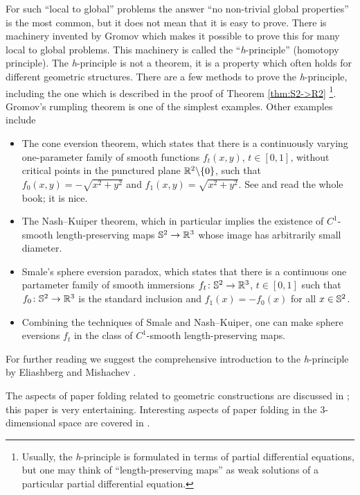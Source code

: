 For such ``local to global'' problems the answer
``no non-trivial global properties''
 is the most common, 
but
it does not mean that it is easy to prove.
There is machinery invented by Gromov
which makes it possible to prove this for many local to global problems.
This machinery is called the ``\textit{h}-principle'' (homotopy principle).
The \textit{h}-principle is not a theorem, it is a property which often holds for different geometric structures.
There are a few methods to prove the
\textit{h}-principle, including the one which is described in the proof of Theorem \ref{thm:S2->R2}%
\footnote{Usually, the \textit{h}-principle is formulated in terms of partial differential equations, 
but one may think of ``length-preserving maps'' as weak solutions of a particular partial differential equation.}.
Gromov's rumpling theorem is one of the simplest examples.
Other examples include 
\begin{itemize}
\item The cone eversion theorem, which states that there is a continuously varying one-parameter family of smooth functions $f_t(x,y)$, $t\in[0,1]$, without critical points in
the punctured plane $\mathbb{R}^2\backslash\{0\}$, 
such that
$f_0(x,y)=-\sqrt{x^2+y^2}$ and $f_{1}(x,y)=\sqrt{x^2+y^2}$.
See \cite[Lecture 27]{TF} and read the whole book; it is nice.
\item The Nash--Kuiper theorem, which in particular implies the existence of $C^1$-smooth length-preserving maps $\mathbb{S}^2\to\mathbb{R}^3$ whose image has arbitrarily small diameter.
\item Smale's sphere eversion paradox, which states that there is a continuous one partameter family of smooth immersions $f_t\colon\mathbb{S}^2\to \mathbb{R}^3$, $t\in[0,1]$ such that $f_0\colon\mathbb{S}^2\to \mathbb{R}^3$ is the standard inclusion and $f_1(x)=-f_0(x)$ for all $x\in \mathbb{S}^2$.
\item Combining the techniques of Smale and Nash--Kuiper, 
one can make sphere eversions $f_t$ in the class of $C^1$-smooth length-preserving maps. 
\end{itemize}
 
For further reading we suggest the comprehensive introduction to the \textit{h}-principle 
by Eliashberg and Mishachev \cite{eliashberg-mishachev}.

 The aspects of paper folding related to geometric constructions are discussed in \cite{hull};
this paper is very entertaining.
Interesting aspects of paper folding in the 3-dimensional space are covered in \cite[Lecture 15]{TF}.




